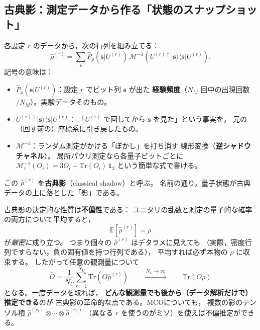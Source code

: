 \documentclass[11pt]{ltjsarticle}
\newcommand{\Tr}{\mathrm{Tr}}
\newcommand{\E}{\mathbb{E}}
\newcommand{\ketbra}[2]{|#1\rangle\langle#2|}
\newcommand{\id}{\mathbb{1}}
\newcommand{\NU}{N_U}
\newcommand{\NM}{N_M}
\begin{document}
\subsection{古典影：測定データから作る「状態のスナップショット」}

各設定 $r$ のデータから，次の行列を組み立てる：
\begin{equation}
  \hat{\rho}^{(r)}
  = \sum_{\mathbf{s}} \hat{P}_\rho(\mathbf{s}|U^{(r)})\,
    \mathcal{M}^{-1}\!\left( U^{(r)\dagger} \ketbra{\mathbf{s}}{\mathbf{s}} U^{(r)} \right).
  \label{eq:shadow}
\end{equation}
記号の意味は：
\begin{itemize}
  \item $\hat{P}_\rho(\mathbf{s}|U^{(r)})$：設定 $r$ でビット列 $\mathbf{s}$ が出た
        \textbf{経験頻度}（$\NM$ 回中の出現回数 $/\NM$）。実験データそのもの。
  \item $U^{(r)\dagger} \ketbra{\mathbf{s}}{\mathbf{s}} U^{(r)}$：
        「$U^{(r)}$ で回してから $\mathbf{s}$ を見た」という事実を，
        元の（回す前の）座標系に引き戻したもの。
  \item $\mathcal{M}^{-1}$：ランダム測定がかける「ぼかし」を打ち消す
        線形変換（\textbf{逆シャドウチャネル}）。
        局所パウリ測定なら各量子ビットごとに
        $\mathcal{M}^{-1}_i(O_i) = 3O_i - \Tr(O_i)\,\id_2$
        という簡単な式で書ける。
\end{itemize}
この $\hat{\rho}^{(r)}$ を\textbf{古典影}（classical shadow）と呼ぶ。
名前の通り，量子状態が古典データの上に落とした「影」である。

古典影の決定的な性質は\textbf{不偏性}である：
ユニタリの乱数と測定の量子的な確率の両方について平均すると，
\begin{equation}
  \E\!\left[\hat{\rho}^{(r)}\right] = \rho
\end{equation}
が\emph{厳密に}成り立つ。
つまり個々の $\hat{\rho}^{(r)}$ はデタラメに見えても
（実際，密度行列ですらない，負の固有値を持つ行列である），
平均すれば必ず本物の $\rho$ に収束する。
したがって任意の観測量について
\begin{equation}
  \hat{O} = \frac{1}{\NU}\sum_{r=1}^{\NU} \Tr\!\left(O\hat{\rho}^{(r)}\right)
  \qquad \xrightarrow{\;\NU \to \infty\;} \qquad \Tr(O\rho)
\end{equation}
となる。一度データを取れば，
\textbf{どんな観測量でも後から（データ解析だけで）推定できる}のが
古典影の革命的な点である。MCOについても，
複数の影のテンソル積 $\hat{\rho}^{(r_1)} \otimes \cdots \otimes \hat{\rho}^{(r_n)}$
（異なる $r$ を使うのがミソ）を使えば不偏推定ができる。
\end{document}
